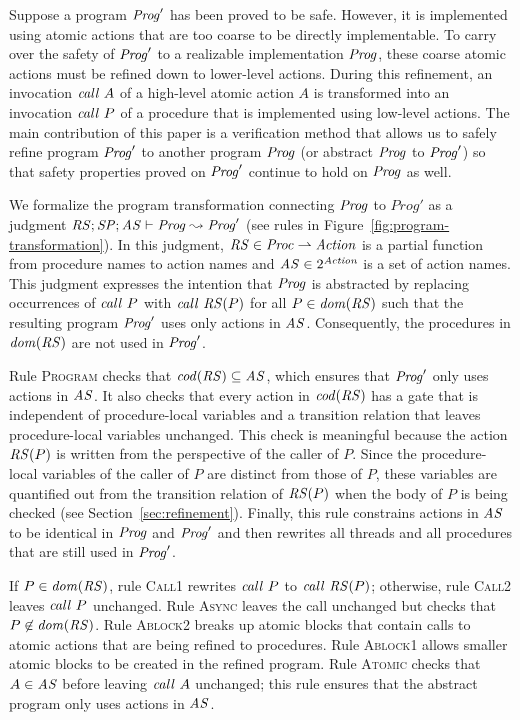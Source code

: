 Suppose a program $\mathit{Prog}'$ has been proved to be safe.
However, it is implemented using atomic actions that are too coarse to be directly implementable.  
To carry over the safety of $\mathit{Prog}'$ to a realizable implementation $\mathit{Prog}$, 
these coarse atomic actions must be refined down to lower-level actions.
During this refinement, an invocation $\mathit{call}\ A$ of a high-level atomic action $A$ is transformed into an 
invocation $\mathit{call}\ P$ of a procedure that is implemented using low-level actions.
The main contribution of this paper is a verification method that allows us to safely refine
program $\mathit{Prog}'$ to another program $\mathit{Prog}$ (or abstract $\mathit{Prog}$ to $\mathit{Prog}'$) so that 
safety properties proved on $\mathit{Prog}'$ continue to hold on $\mathit{Prog}$ as well.

We formalize the program transformation connecting $\mathit{Prog}$ to $Prog'$ as a judgment
$\mathit{RS};\mathit{SP};\mathit{AS} \vdash \mathit{Prog} \leadsto \mathit{Prog}'$ (see rules in Figure~\ref{fig:program-transformation}).
In this judgment,
$\mathit{RS} \in \mathit{Proc} \rightharpoonup \mathit{Action}$ is a partial function from procedure names to action names
and $\mathit{AS} \in 2^{\mathit{Action}}$ is a set of action names.
This judgment expresses the intention that $\mathit{Prog}$ is abstracted by replacing
occurrences of $\mathit{call}\ P$ with $\mathit{call}\ \mathit{RS}(P)$ for all $P \in \mathit{dom}(\mathit{RS})$ such that 
the resulting program $\mathit{Prog}'$ uses only actions in $\mathit{AS}$.
Consequently, the procedures in $\mathit{dom}(\mathit{RS})$ are not used in $\mathit{Prog}'$.

Rule \textsc{Program} checks that $\mathit{cod}(\mathit{RS}) \subseteq \mathit{AS}$,
which ensures that $\mathit{Prog}'$ only uses actions in $\mathit{AS}$.
It also checks that every action in $\mathit{cod}(\mathit{RS})$ has a gate 
that is independent of procedure-local variables and a transition relation that leaves 
procedure-local variables unchanged.  
This check is meaningful because the action $\mathit{RS}(P)$ is written from the 
perspective of the caller of $P$.
Since the procedure-local variables of the caller of $P$ are distinct from those of $P$,
these variables are quantified out from the transition relation of $\mathit{RS}(P)$ when 
the body of $P$ is being checked (see Section~\ref{sec:refinement}).
Finally, this rule constrains actions in $\mathit{AS}$ to be identical in $\mathit{Prog}$ and $\mathit{Prog}'$ and then rewrites all threads
and all procedures that are still used in $\mathit{Prog}'$.

If $P \in \mathit{dom}(\mathit{RS})$, rule \textsc{Call1} rewrites $\mathit{call}\ P$ to $\mathit{call}\ \mathit{RS}(P)$;
otherwise, rule \textsc{Call2} leaves $\mathit{call}\ P$ unchanged.
Rule \textsc{Async} leaves the call unchanged but checks that $P \not \in \mathit{dom}(\mathit{RS})$.
Rule \textsc{Ablock2} breaks up atomic blocks that contain calls
to atomic actions that are being refined to procedures.
Rule \textsc{Ablock1} allows smaller atomic blocks to be created in the refined program.
Rule \textsc{Atomic} checks that $A \in \mathit{AS}$ before leaving $\mathit{call}\ A$ unchanged;
this rule ensures that the abstract program only uses actions in $\mathit{AS}$.

